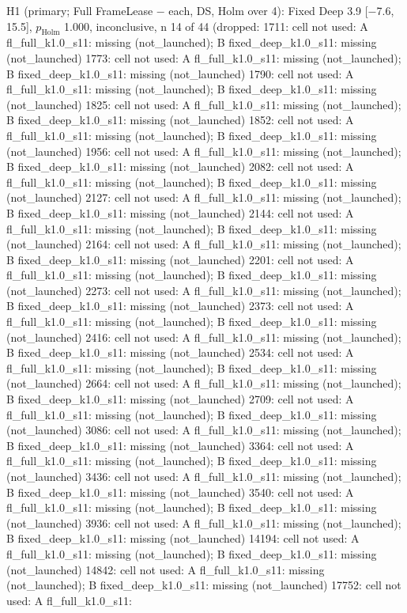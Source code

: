 \begin{table}[t]
{H1 (primary; Full FrameLease $-$ each, DS, Holm over 4): Fixed Deep 3.9 [$-$7.6, 15.5], $p_\mathrm{Holm}$ 1.000, inconclusive, n 14 of 44 (dropped: 1711: cell not used: A fl\_full\_k1.0\_s11: missing (not\_launched); B fixed\_deep\_k1.0\_s11: missing (not\_launched) \textbar{} 1773: cell not used: A fl\_full\_k1.0\_s11: missing (not\_launched); B fixed\_deep\_k1.0\_s11: missing (not\_launched) \textbar{} 1790: cell not used: A fl\_full\_k1.0\_s11: missing (not\_launched); B fixed\_deep\_k1.0\_s11: missing (not\_launched) \textbar{} 1825: cell not used: A fl\_full\_k1.0\_s11: missing (not\_launched); B fixed\_deep\_k1.0\_s11: missing (not\_launched) \textbar{} 1852: cell not used: A fl\_full\_k1.0\_s11: missing (not\_launched); B fixed\_deep\_k1.0\_s11: missing (not\_launched) \textbar{} 1956: cell not used: A fl\_full\_k1.0\_s11: missing (not\_launched); B fixed\_deep\_k1.0\_s11: missing (not\_launched) \textbar{} 2082: cell not used: A fl\_full\_k1.0\_s11: missing (not\_launched); B fixed\_deep\_k1.0\_s11: missing (not\_launched) \textbar{} 2127: cell not used: A fl\_full\_k1.0\_s11: missing (not\_launched); B fixed\_deep\_k1.0\_s11: missing (not\_launched) \textbar{} 2144: cell not used: A fl\_full\_k1.0\_s11: missing (not\_launched); B fixed\_deep\_k1.0\_s11: missing (not\_launched) \textbar{} 2164: cell not used: A fl\_full\_k1.0\_s11: missing (not\_launched); B fixed\_deep\_k1.0\_s11: missing (not\_launched) \textbar{} 2201: cell not used: A fl\_full\_k1.0\_s11: missing (not\_launched); B fixed\_deep\_k1.0\_s11: missing (not\_launched) \textbar{} 2273: cell not used: A fl\_full\_k1.0\_s11: missing (not\_launched); B fixed\_deep\_k1.0\_s11: missing (not\_launched) \textbar{} 2373: cell not used: A fl\_full\_k1.0\_s11: missing (not\_launched); B fixed\_deep\_k1.0\_s11: missing (not\_launched) \textbar{} 2416: cell not used: A fl\_full\_k1.0\_s11: missing (not\_launched); B fixed\_deep\_k1.0\_s11: missing (not\_launched) \textbar{} 2534: cell not used: A fl\_full\_k1.0\_s11: missing (not\_launched); B fixed\_deep\_k1.0\_s11: missing (not\_launched) \textbar{} 2664: cell not used: A fl\_full\_k1.0\_s11: missing (not\_launched); B fixed\_deep\_k1.0\_s11: missing (not\_launched) \textbar{} 2709: cell not used: A fl\_full\_k1.0\_s11: missing (not\_launched); B fixed\_deep\_k1.0\_s11: missing (not\_launched) \textbar{} 3086: cell not used: A fl\_full\_k1.0\_s11: missing (not\_launched); B fixed\_deep\_k1.0\_s11: missing (not\_launched) \textbar{} 3364: cell not used: A fl\_full\_k1.0\_s11: missing (not\_launched); B fixed\_deep\_k1.0\_s11: missing (not\_launched) \textbar{} 3436: cell not used: A fl\_full\_k1.0\_s11: missing (not\_launched); B fixed\_deep\_k1.0\_s11: missing (not\_launched) \textbar{} 3540: cell not used: A fl\_full\_k1.0\_s11: missing (not\_launched); B fixed\_deep\_k1.0\_s11: missing (not\_launched) \textbar{} 3936: cell not used: A fl\_full\_k1.0\_s11: missing (not\_launched); B fixed\_deep\_k1.0\_s11: missing (not\_launched) \textbar{} 14194: cell not used: A fl\_full\_k1.0\_s11: missing (not\_launched); B fixed\_deep\_k1.0\_s11: missing (not\_launched) \textbar{} 14842: cell not used: A fl\_full\_k1.0\_s11: missing (not\_launched); B fixed\_deep\_k1.0\_s11: missing (not\_launched) \textbar{} 17752: cell not used: A fl\_full\_k1.0\_s11: }
\end{table}
